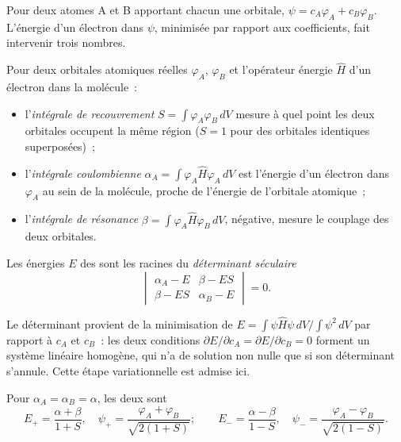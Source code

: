 Pour deux atomes A et B apportant chacun une orbitale, $\psi = c_A\varphi_A + c_B\varphi_B$.
L'énergie d'un électron dans $\psi$, minimisée par rapport aux coefficients,
fait intervenir trois nombres.

\begin{definition}\label{def:b2:diatomic-mos:integrals}
Pour deux orbitales atomiques réelles $\varphi_A$, $\varphi_B$ et l'opérateur énergie $\hat H$
d'un électron dans la molécule~:
\begin{itemize}
  \item l'\emph{intégrale de recouvrement} $S = \int\varphi_A\varphi_B\,dV$
        mesure à quel point les deux orbitales occupent la même région ($S = 1$ pour des
        orbitales identiques superposées)~;
  \item l'\emph{intégrale coulombienne} $\alpha_A = \int\varphi_A\hat
        H\varphi_A\,dV$ est l'énergie d'un électron dans $\varphi_A$ au sein de la molécule,
        proche de l'énergie de l'orbitale atomique~;
  \item l'\emph{intégrale de résonance} $\beta = \int\varphi_A\hat
        H\varphi_B\,dV$, négative, mesure le couplage des deux orbitales.
\end{itemize}
Les énergies $E$ des  sont les racines du \emph{déterminant
séculaire}
\[
  \begin{vmatrix} \alpha_A - E & \beta - ES \\ \beta - ES & \alpha_B - E \end{vmatrix} = 0 .
\]
\end{definition}

Le déterminant provient de la minimisation de $E = \int\psi\hat H\psi\,dV/\int\psi^2\,dV$
par rapport à $c_A$ et $c_B$~: les deux conditions $\partial E/\partial c_A =
\partial E/\partial c_B = 0$ forment un système linéaire homogène, qui n'a de solution
non nulle que si son déterminant s'annule. Cette étape variationnelle est admise
ici.

\begin{theorem}\label{thm:b2:diatomic-mos:homonuclear}
Pour $\alpha_A = \alpha_B = \alpha$, les deux  sont
\[
  E_+ = \frac{\alpha + \beta}{1 + S}, \quad \psi_+ = \frac{\varphi_A + \varphi_B}{\sqrt{2(1 + S)}} ;
  \qquad
  E_- = \frac{\alpha - \beta}{1 - S}, \quad \psi_- = \frac{\varphi_A - \varphi_B}{\sqrt{2(1 - S)}} .
\]
\end{theorem}


